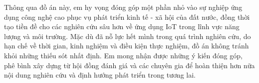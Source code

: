 \documentclass[../main.tex]{subfiles}
\begin{document}
Thông qua đồ án này, em hy vọng đóng góp một phần nhỏ vào sự nghiệp ứng dụng công nghệ cao phục vụ phát triển kinh tế - xã hội của đất nước, đồng thời tạo tiền đề cho các nghiên cứu sâu hơn về ứng dụng IoT trong lĩnh vực năng lượng và môi trường. Mặc dù đã nỗ lực hết mình trong quá trình nghiên cứu, do hạn chế về thời gian, kinh nghiệm và điều kiện thực nghiệm, đồ án không tránh khỏi những thiếu sót nhất định. Em mong nhận được những ý kiến đóng góp, phê bình xây dựng từ hội đồng đánh giá và các chuyên gia để hoàn thiện hơn nữa nội dung nghiên cứu và định hướng phát triển trong tương lai.
\end{document}
